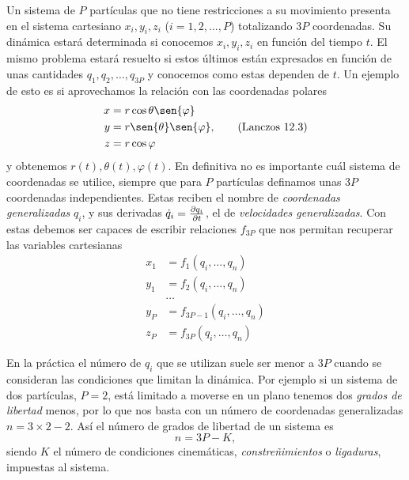 \documentclass[12pt, spanish, a4paper, ]{article}
\begin{document}
Un sistema de \(P\) partículas que no tiene restricciones a su movimiento presenta en el sistema cartesiano \(x_i, y_i, z_i\) (\(i=1, 2, \ldots, P\)) totalizando \(3P\) coordenadas.
Su dinámica estará determinada si conocemos \(x_i, y_i, z_i\) en función del tiempo \(t\).
El mismo problema estará resuelto si estos últimos están expresados en función de unas cantidades \(q_1, q_2, \ldots, q_{3P}\) y conocemos como estas dependen de \(t\).
Un ejemplo de esto es si aprovechamos la relación con las coordenadas polares
\begin{equation}\label{Lanczos12.3}
	\begin{aligned}
		x &= r \cos{\theta} \sen{\varphi}\\
		y &= r \sen{\theta} \sen{\varphi}\\
		z &= r \cos{\varphi}
	\end{aligned},
	\tag{Lanczos 12.3}
\end{equation}
y obtenemos \(r(t), \theta(t), \varphi(t)\).
En definitiva no es importante cuál sistema de coordenadas se utilice, siempre que para \(P\) partículas definamos unas \(3P\) coordenadas independientes.
Estas reciben el nombre de \emph{coordenadas generalizadas} \(q_i\), y sus derivadas \(\dot{q}_i= \pdv{q_i}{t}\), el de \emph{velocidades generalizadas}.
Con estas debemos ser capaces de escribir relaciones \(f_{3P}\) que nos permitan recuperar las variables cartesianas
\begin{equation}\label{Lanczos12.8}
	\begin{aligned}
		x_1 &= f_1(q_i, \ldots, q_n) \\
		y_1 &= f_2(q_i, \ldots, q_n) \\
		& \ldots \\
		y_P &= f_{3P-1}(q_i, \ldots, q_n) \\
		z_P &= f_{3P}(q_i, \ldots, q_n)
	\end{aligned}
	\tag{Lanczos 12.8}
\end{equation}

En la práctica el número de \(q_i\) que se utilizan suele ser menor a \(3P\) cuando se consideran las condiciones que limitan la dinámica.
Por ejemplo si un sistema de dos partículas, \(P=2\), está limitado a moverse en un plano tenemos dos \emph{grados de libertad} menos, por lo que nos basta con un número de coordenadas generalizadas \(n= 3\times 2- 2\).
Así el número de grados de libertad de un sistema es 
\begin{equation}
	n= 3 P- K,
\end{equation}
siendo \(K\) el número de condiciones cinemáticas, \emph{constreñimientos }o \emph{ligaduras}, impuestas al sistema.
\end{document}
